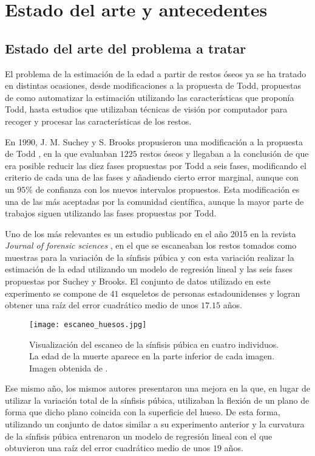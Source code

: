 \section{Estado del arte y antecedentes}

\subsection{Estado del arte del problema a tratar}

El problema de la estimación de la edad a partir de restos óseos ya se ha tratado en distintas ocasiones, desde modificaciones a la propuesta de Todd, propuestas de como automatizar la estimación utilizando las características que proponía Todd, hasta estudios que utilizaban técnicas de visión por computador para recoger y procesar las características de los restos.

En 1990, J. M. Suchey y S. Brooks propusieron una modificación a la propuesta de Todd \cite{sucheyBrooks}, en la que evaluaban $1225$ restos óseos y llegaban a la conclusión de que era posible reducir las diez fases propuestas por Todd a seis fases, modificando el criterio de cada una de las fases y añadiendo cierto error marginal, aunque con un $95\%$ de confianza con los nuevos intervalos propuestos. Esta modificación es una de las más aceptadas por la comunidad científica, aunque la mayor parte de trabajos siguen utilizando las fases propuestas por Todd.

Uno de los más relevantes es un estudio publicado en el año 2015 en la revista \textit{Journal of forensic sciences} \cite{modelandoHuesos3D}, en el que se escaneaban los restos tomados como muestras para la variación de la sínfisis púbica y con esta variación realizar la estimación de la edad utilizando un modelo de regresión lineal y las seis fases propuestas por Suchey y Brooks. El conjunto de datos utilizado en este experimento se compone de $41$ esqueletos de personas estadounidenses y logran obtener una raíz del error cuadrático medio de unos $17.15$ años.

\begin{figure}[H]
	\centering
	\texttt{[image: escaneo\_huesos.jpg]}
	\caption{Visualización del escaneo de la sínfisis púbica en cuatro individuos. La edad de la muerte aparece en la parte inferior de cada imagen. Imagen obtenida de \cite{modelandoHuesos3D}.}
	\label{fig:escaneo_huesos}
\end{figure}

Ese mismo año, los mismos autores presentaron una mejora \cite{mejoraModelandoHuesos3D} en la que, en lugar de utilizar la variación total de la sínfisis púbica, utilizaban la flexión de un plano de forma que dicho plano coincida con la superficie del hueso. De esta forma, utilizando un conjunto de datos similar a su experimento anterior y la curvatura de la sínfisis púbica entrenaron un modelo de regresión lineal con el que obtuvieron una raíz del error cuadrático medio de unos $19$ años.

